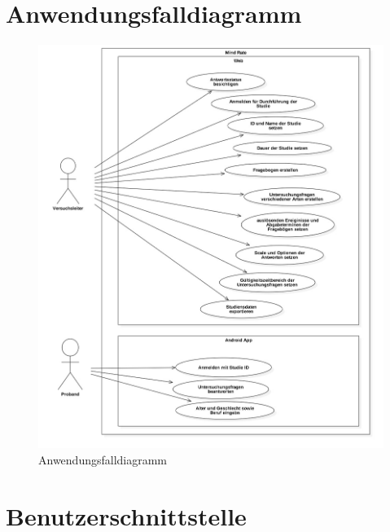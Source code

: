 \documentclass[a4paper]{scrreprt}
\begin{document}
        \section{Anwendungsfalldiagramm}
            \vspace*{2cm}
            \begin{figure}[htbp]
                \centering
                \includegraphics[scale = 0.35]{UseCaseDiagram1.jpg}
                \caption{Anwendungsfalldiagramm}
            \end{figure}

        \newpage
        \section{Benutzerschnittstelle}

            \vspace*{1cm}
\end{document}
